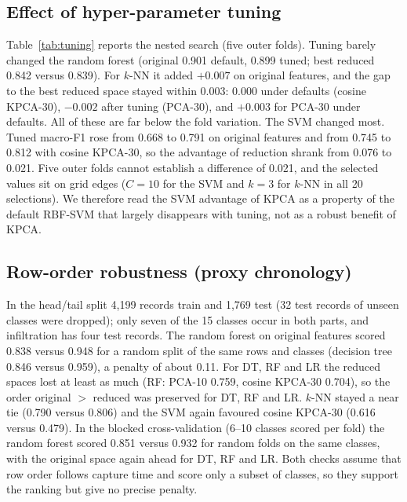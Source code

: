 \documentclass[runningheads]{llncs}
\begin{document}
\subsection{Effect of hyper-parameter tuning}
Table~\ref{tab:tuning} reports the nested search (five outer folds). Tuning barely changed the random forest (original 0.901 default, 0.899 tuned; best reduced 0.842 versus 0.839). For $k$-NN it added $+0.007$ on original features, and the gap to the best reduced space stayed within 0.003: 0.000 under defaults (cosine KPCA-30), $-0.002$ after tuning (PCA-30), and $+0.003$ for PCA-30 under defaults. All of these are far below the fold variation. The SVM changed most. Tuned macro-F1 rose from 0.668 to 0.791 on original features and from 0.745 to 0.812 with cosine KPCA-30, so the advantage of reduction shrank from 0.076 to 0.021. Five outer folds cannot establish a difference of 0.021, and the selected values sit on grid edges ($C=10$ for the SVM and $k=3$ for $k$-NN in all 20 selections). We therefore read the SVM advantage of KPCA as a property of the default RBF-SVM that largely disappears with tuning, not as a robust benefit of KPCA.

\begin{table}[!htbp]
\caption{Nested hyper-parameter search: mean macro-F1 over five outer folds. For each setting (default, tuned) the best reduced space among PCA-30, KPCA-cos-30 and KPCA-RBF-30 is chosen by that setting\textquoteright s own score; $\Delta$ = original $-$ reduced (negative: reduction better). K-cos-30 = KPCA, cosine kernel, 30 components. The last column gives the default-setting gap measured in the tuned-best reduced space.}\label{tab:tuning}
\centering\scriptsize
\resizebox{\textwidth}{!}{}
\end{table}

\subsection{Row-order robustness (proxy chronology)}
In the head/tail split 4{,}199 records train and 1{,}769 test (32 test records of unseen classes were dropped); only seven of the 15 classes occur in both parts, and infiltration has four test records. The random forest on original features scored 0.838 versus 0.948 for a random split of the same rows and classes (decision tree 0.846 versus 0.959), a penalty of about 0.11. For DT, RF and LR the reduced spaces lost at least as much (RF: PCA-10 0.759, cosine KPCA-30 0.704), so the order original $>$ reduced was preserved for DT, RF and LR. $k$-NN stayed a near tie (0.790 versus 0.806) and the SVM again favoured cosine KPCA-30 (0.616 versus 0.479). In the blocked cross-validation (6--10 classes scored per fold) the random forest scored 0.851 versus 0.932 for random folds on the same classes, with the original space again ahead for DT, RF and LR. Both checks assume that row order follows capture time and score only a subset of classes, so they support the ranking but give no precise penalty.
\end{document}
